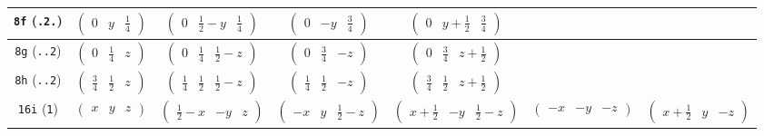 \documentclass[fleqn,9pt,landscape]{jsarticle}
\begin{document}
\begin{center}
\begin{longtable}{ccccccc}
{\tt 8f} ({\tt .2.}) & $ \begin{pmatrix} 0 & y & \frac{1}{4} \end{pmatrix} $ & $ \begin{pmatrix} 0 & \frac{1}{2} - y & \frac{1}{4} \end{pmatrix} $ & $ \begin{pmatrix} 0 & - y & \frac{3}{4} \end{pmatrix} $ & $ \begin{pmatrix} 0 & y + \frac{1}{2} & \frac{3}{4} \end{pmatrix} $ & $  $ & $  $ \\ \hline
{\tt 8g} ({\tt ..2}) & $ \begin{pmatrix} 0 & \frac{1}{4} & z \end{pmatrix} $ & $ \begin{pmatrix} 0 & \frac{1}{4} & \frac{1}{2} - z \end{pmatrix} $ & $ \begin{pmatrix} 0 & \frac{3}{4} & - z \end{pmatrix} $ & $ \begin{pmatrix} 0 & \frac{3}{4} & z + \frac{1}{2} \end{pmatrix} $ & $  $ & $  $ \\ \hline
{\tt 8h} ({\tt ..2}) & $ \begin{pmatrix} \frac{3}{4} & \frac{1}{2} & z \end{pmatrix} $ & $ \begin{pmatrix} \frac{1}{4} & \frac{1}{2} & \frac{1}{2} - z \end{pmatrix} $ & $ \begin{pmatrix} \frac{1}{4} & \frac{1}{2} & - z \end{pmatrix} $ & $ \begin{pmatrix} \frac{3}{4} & \frac{1}{2} & z + \frac{1}{2} \end{pmatrix} $ & $  $ & $  $ \\ \hline
{\tt 16i} ({\tt 1}) & $ \begin{pmatrix} x & y & z \end{pmatrix} $ & $ \begin{pmatrix} \frac{1}{2} - x & - y & z \end{pmatrix} $ & $ \begin{pmatrix} - x & y & \frac{1}{2} - z \end{pmatrix} $ & $ \begin{pmatrix} x + \frac{1}{2} & - y & \frac{1}{2} - z \end{pmatrix} $ & $ \begin{pmatrix} - x & - y & - z \end{pmatrix} $ & $ \begin{pmatrix} x + \frac{1}{2} & y & - z \end{pmatrix} $ \\

\end{longtable}
\end{center}
\end{document}
